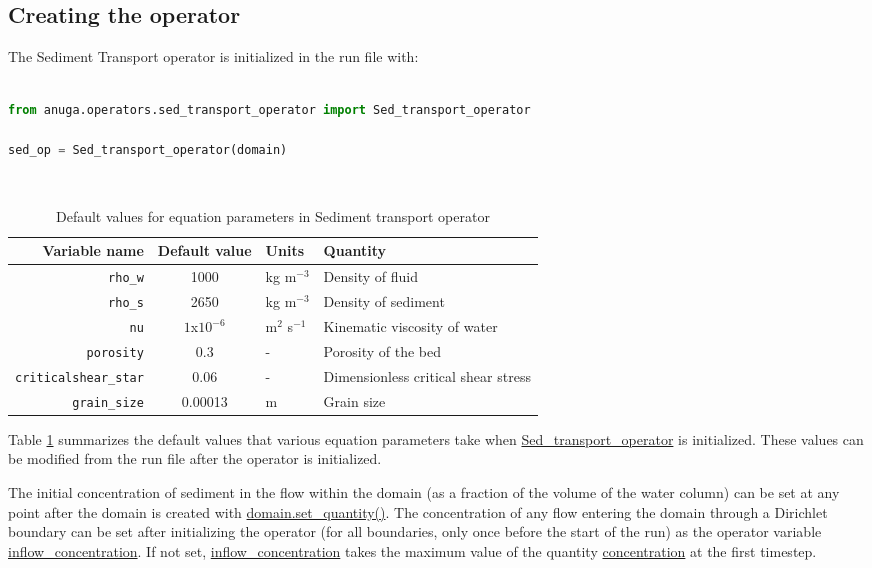 \documentclass[10pt]{article}
\newcommand{\ra}[1]{\renewcommand{\arraystretch}{#1}}
\begin{document}
\subsection{Creating the operator}

The Sediment Transport operator is initialized in the run file with:

\begin{minipage}[c]{0.95\textwidth}
\begin{lstlisting}[language=Python, title=Initializing the sediment transport operator]
 
from anuga.operators.sed_transport_operator import Sed_transport_operator

sed_op = Sed_transport_operator(domain)

\end{lstlisting}
\end{minipage}
\ \\

\begin{table}[h]
\centering
\ra{1.3}
\begin{tabular}{@{}rcll@{}}
\toprule
Variable name & Default value & Units & Quantity  \\ \midrule
\verb!rho_w! & 1000 & kg m$^{-3}$ & Density of fluid  \\
\verb!rho_s! & 2650 & kg m$^{-3}$ & Density of sediment \\
\verb!nu!         &  $1$x${10}^{-6}$    &   m$^2$ s$^{-1}$          &   Kinematic viscosity of water       \\
\verb!porosity!         &   0.3   &     -        & Porosity of the bed  \\
\verb!criticalshear_star!         &   0.06   &     -        & Dimensionless critical shear stress    \\
\verb!grain_size!         &   0.00013   &     m        & Grain size       \\
\bottomrule
\end{tabular}
\caption{Default values for equation parameters in Sediment transport operator}
\label{table:sed_transport_parameters}
\end{table}

Table \ref{table:sed_transport_parameters} summarizes the default values that various equation parameters take when \url{Sed_transport_operator} is initialized. These values can be modified from the run file after the operator is initialized.

The initial concentration of sediment in the flow within the domain (as a fraction of the volume of the water column) can be set at any point after the domain is created with \url{domain.set_quantity()}. The concentration of any flow entering the domain through a Dirichlet boundary can be set after initializing the operator (for all boundaries, only once before the start of the run) as the operator variable \url{inflow_concentration}. If not set, \url{inflow_concentration} takes the maximum value of the quantity \url{concentration} at the first timestep.
\end{document}
